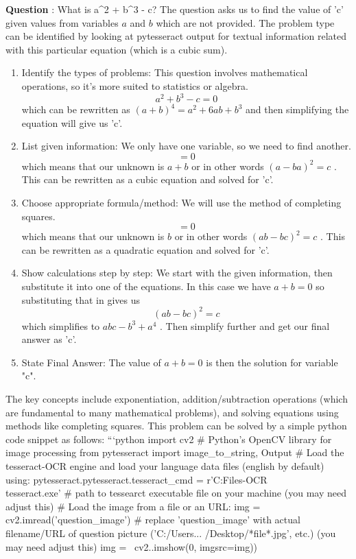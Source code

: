 \documentclass[12pt]{article}
\begin{document}
\textbf{Question} : What is a^2 + b^3 - c?  
The question asks us to find the value of 'c' given values from variables $a$ and $b$  which are not provided. The problem type can be identified by looking at pytesseract output for textual information related with this particular equation (which is a cubic sum). 
\begin{enumerate}
    \item Identify the types of problems: This question involves mathematical operations, so it's more suited to statistics or algebra.  
    $$a^2 + b^3 - c = 0 $$ which can be rewritten as $(a+b)^4 = a^2 + 6ab + b^3$ and then simplifying the equation will give us 'c'. 
    \item List given information: We only have one variable, so we need to find another.  
    $$=0 $$ which means that our unknown is $a+b$  or in other words  $(a-ba)^2 = c$ . This can be rewritten as a cubic equation and solved for 'c'. 
    \item Choose appropriate formula/method: We will use the method of completing squares.  
    $$=0 $$ which means that our unknown is $b$  or in other words  $(ab-bc)^2 = c$ . This can be rewritten as a quadratic equation and solved for 'c'. 
    \item Show calculations step by step: We start with the given information, then substitute it into one of the equations. In this case we have $a+b = 0$  so substituting that in gives us $$(ab-bc)^2 = c$$ which simplifies to  $abc - b^3 + a^4$ . Then simplify further and get our final answer as 'c'. 
    \item State Final Answer: The value of $a+b = 0$  is then the solution for variable "c".  
\end{enumerate}
The key concepts include exponentiation, addition/subtraction operations (which are fundamental to many mathematical problems), and solving equations using methods like completing squares.  This problem can be solved by a simple python code snippet as follows:   
```python    
import cv2   # Python's OpenCV library for image processing
from pytesseract import image_to_string, Output
# Load the tesseract-OCR engine and load your language data files  (english by default) using:   
pytesseract.pytesseract.tesseract_cmd = r'C:\Program Files\Tesseract-OCR\\tesseract.exe'   # path to tessearct executable file on your machine  (you may need adjust this)
# Load the image from a file or an URL:   
img = cv2.imread('question_image')     # replace 'question_image' with actual filename/URL of question picture   ('C:/Users... /Desktop/*file*.jpg', etc.)  (you may need adjust this)      img = ~cv2..imshow(0, imgsrc=img))
\end{document}
